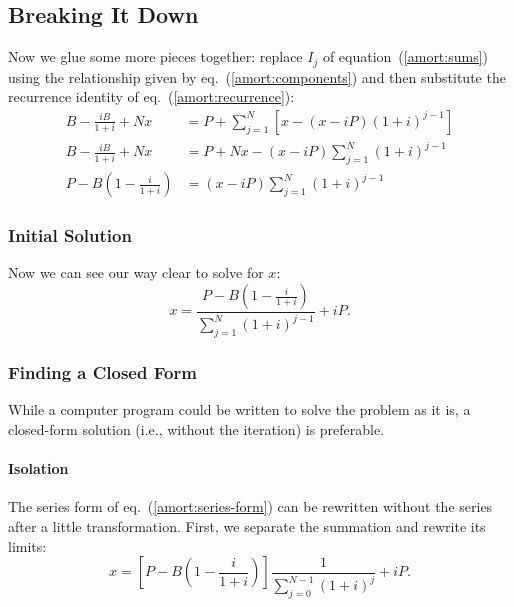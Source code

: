 
\subsection{Breaking It Down}
Now we glue some more pieces together: replace $I_j$ of
equation~(\ref{amort:sums}) using the relationship given by
eq.~(\ref{amort:components}) and then substitute the recurrence identity
of eq.~(\ref{amort:recurrence}):
\begin{align}
B - \frac{iB}{1+i} + Nx &{}= 
  P + \sum_{j=1}^N \left[x - (x - iP)(1 + i)^{j-1}\right] \nonumber \\
B - \frac{iB}{1+i} + Nx &{}= 
  P + Nx - (x - iP)\sum_{j=1}^N (1 + i)^{j-1} \nonumber \\
P - B\left(1 - \frac{i}{1+i}\right) &{}= (x - iP)\sum_{j=1}^N (1 + i)^{j-1}
\end{align}

\subsubsection{Initial Solution}
Now we can see our way clear to solve for $x$:
\begin{equation}
\label{amort:series-form}
x = \frac{P - B\left(1-\frac{i}{1+i}\right)}{\displaystyle\sum_{j=1}^{N} (1+i)^{j-1}} 
  + iP.
\end{equation}

\subsubsection{Finding a Closed Form}
While a computer program could be written to solve the problem as
it is, a closed-form solution (i.e., without the iteration) is
preferable.
\paragraph{Isolation} 
The series form of eq.~(\ref{amort:series-form}) can be rewritten
without the series after a little transformation.  First, we separate
the summation and rewrite its limits:
\begin{equation}
x = \left[P - B\left(1 - \frac{i}{1+i}\right)\right]
    \frac{1}{\displaystyle\sum_{j=0}^{N-1}(1+i)^j} + iP.
\end{equation}
